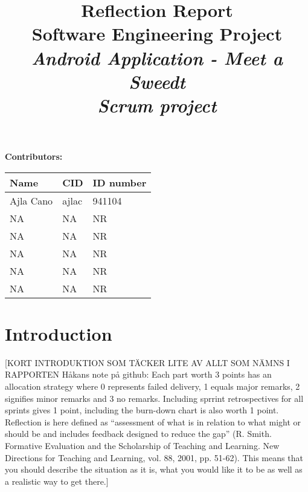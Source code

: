 \documentclass[a4paper,11pt]{article}
\begin{document}
\begin{titlepage}

\title{\Huge{Reflection Report} \\[0.1cm] \Large{Software Engineering Project} \\ [0.9cm] \Large{ \emph{Android Application - Meet a Sweedt}} \\[0.2cm] \Large{ \emph{Scrum project}}}
\maketitle
\begin{center}
\large{ \textbf{Contributors:} } 
\newline \newline
\begin{tabular}{|l|l|l|} \hline
Name      & CID    & ID number  \\   \hline 
Ajla Cano & ajlac  & 941104    \\ \hline 
NA  & NA & NR     \\ \hline
NA  & NA & NR     \\ \hline 
NA  & NA & NR     \\ \hline 
NA  & NA & NR   \\  \hline 
NA  & NA & NR  \\  \hline
\end{tabular}
\end{center}
\thispagestyle{empty}
\end{titlepage}

\clearpage
\section{Introduction}
[KORT INTRODUKTION SOM TÄCKER LITE AV ALLT SOM NÄMNS I RAPPORTEN 
\newline
Håkans note på github: 
Each part worth 3 points has an allocation strategy where 0 represents failed delivery, 1 equals major remarks, 2 signifies minor remarks and 3 no remarks. Including sprrint retrospectives for all sprints gives 1 point, including the burn-down chart is also worth 1 point.
\\ 
Reflection is here defined as “assessment of what is in relation to what might or should be and includes feedback designed to reduce the gap” (R. Smith. Formative Evaluation and the Scholarship of Teaching and Learning. New Directions for Teaching and Learning, vol. 88, 2001, pp. 51-62). This means that you should describe the situation as it is, what you would like it to be as well as a realistic way to get there.]
\end{document}
